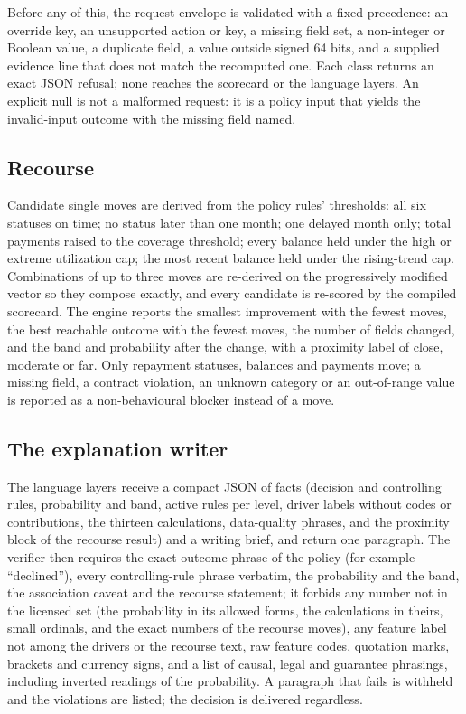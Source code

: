 \documentclass[twocolumn,10pt]{article}
\begin{document}
Before any of this, the request envelope is validated with a fixed precedence: an override key, an unsupported action or
key, a missing field set, a non-integer or Boolean value, a duplicate field, a value outside signed 64 bits, and a supplied
evidence line that does not match the recomputed one. Each class returns an exact JSON refusal; none reaches the scorecard
or the language layers. An explicit null is not a malformed request: it is a policy input that yields the invalid-input
outcome with the missing field named.

\subsection{Recourse}

Candidate single moves are derived from the policy rules' thresholds: all six statuses on time; no status later than one month;
one delayed month only; total payments raised to the coverage threshold; every balance held under the high or extreme
utilization cap; the most recent balance held under the rising-trend cap. Combinations of up to three moves are re-derived
on the progressively modified vector so they compose exactly, and every candidate is re-scored by the compiled scorecard.
The engine reports the smallest improvement with the fewest moves, the best reachable outcome with the fewest moves, the
number of fields changed, and the band and probability after the change, with a proximity label of close, moderate or far.
Only repayment statuses, balances and payments move; a missing field, a contract violation, an unknown category or an
out-of-range value is reported as a non-behavioural blocker instead of a move.

\subsection{The explanation writer}
\label{sec:writer}

The language layers receive a compact JSON of facts (decision and controlling rules, probability and band, active rules
per level, driver labels without codes or contributions, the thirteen calculations, data-quality phrases, and the
proximity block of the recourse result) and a writing brief, and return one paragraph. The verifier then requires the
exact outcome phrase of the policy (for example ``declined''), every controlling-rule phrase verbatim, the probability and the band, the association caveat and the
recourse statement; it forbids any number not in the licensed set (the probability in its allowed forms, the calculations
in theirs, small ordinals, and the exact numbers of the recourse moves), any feature label not among the drivers or the
recourse text, raw feature codes, quotation marks, brackets and currency signs, and a list of causal, legal and guarantee
phrasings, including inverted readings of the probability. A paragraph that fails is withheld and the violations are
listed; the decision is delivered regardless.
\end{document}
